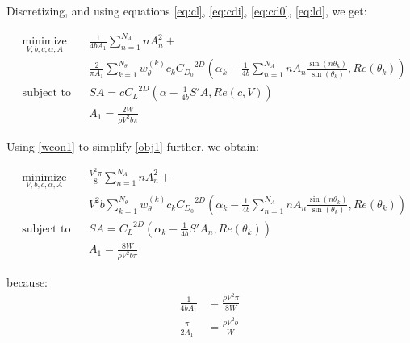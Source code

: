 \documentclass[letterpaper,12pt]{article}
\begin{document}
Discretizing, and using equations \ref{eq:cl}, \ref{eq:cdi}, \ref{eq:cd0}, \ref{eq:ld}, we get:


\begin{align}
	& \underset{V, b, c, \alpha, A}{\text{minimize}}
	& & \frac {1}{4bA_1} \sum_{n=1}^{N_A} n A_{n}^2 + \nonumber \\
	&&& \frac 2 {\pi A_1} \sum_{k=1}^{N_{\theta}} w_{\theta}^{(k)} c_k {C_{D_0}}^{2D}\left( 
		\alpha_k - 
		\frac {1}{4b} \sum_{n=1}^{N_A} n A_n \frac{ \sin(n\theta_k) }{\sin(\theta_k)} , Re(\theta_k)
		\right) \label{obj1} \\
	& \text{subject to}
	& & SA = c {C_L}^{2D} \left( \alpha - \frac {1}{4b} S' A , Re(c, V)\right)   \label{llcon1}\\
	& &  & A_1 = \frac{2W}{\rho V^2 b \pi} \label{wcon1}
\end{align}

Using \ref{wcon1} to simplify \ref{obj1} further, we obtain:

\begin{align}
	& \underset{V, b, c, \alpha, A}{\text{minimize}}
	& & \frac{V^2 \pi}{8}\sum_{n=1}^{N_A} n A_{n}^2 + \nonumber \\
	&&&  V^2 b  \sum_{k=1}^{N_{\theta}} w_{\theta}^{(k)} c_k {C_{D_0}}^{2D}\left( 
		\alpha_k - 
		\frac {1}{4b} \sum_{n=1}^{N_A} n A_n \frac{ \sin(n\theta_k) }{\sin(\theta_k)} , Re(\theta_k)
		\right) \label{obj2} \\
	& \text{subject to}
	& & SA =  {C_L}^{2D} \left( \alpha_k - \frac {1}{4b} S' A_n , Re(\theta_k)\right)  \label{llcon2}\\
	& &  & A_1 = \frac{8W}{\rho V^2 b \pi} \label{wcon2}
\end{align}

because:
\begin{align*}
	\frac{1}{4bA_1} &= \frac{\rho V^2 \pi}{8W} \\
	\frac{\pi}{2A_1} &= \frac{\rho V^2 b}{ W} 
\end{align*}

\end{document}
